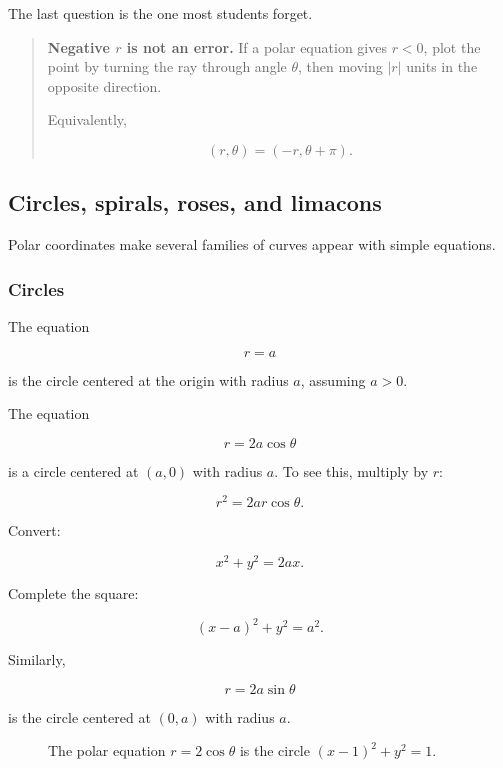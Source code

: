 The last question is the one most students forget.

\begin{quote}
\textbf{Negative \(r\) is not an error.}
If a polar equation gives \(r<0\), plot the point by turning the ray through angle
\(\theta\), then moving \(|r|\) units in the opposite direction.

Equivalently,

\[
(r,\theta)=(-r,\theta+\pi).
\]
\end{quote}

\subsection{Circles, spirals, roses, and limacons}
\label{subsec:polar-families}

Polar coordinates make several families of curves appear with simple equations.

\subsubsection*{Circles}

The equation

\[
r=a
\]

is the circle centered at the origin with radius \(a\), assuming \(a>0\).

The equation

\[
r=2a\cos\theta
\]

is a circle centered at \((a,0)\) with radius \(a\).  To see this, multiply by \(r\):

\[
r^2=2ar\cos\theta.
\]

Convert:

\[
x^2+y^2=2ax.
\]

Complete the square:

\[
(x-a)^2+y^2=a^2.
\]

Similarly,

\[
r=2a\sin\theta
\]

is the circle centered at \((0,a)\) with radius \(a\).

\begin{figure}[h]
\centering
{}
\caption{The polar equation \(r=2\cos\theta\) is the circle \((x-1)^2+y^2=1\).}
\label{fig:polar-circle-offset}
\end{figure}


